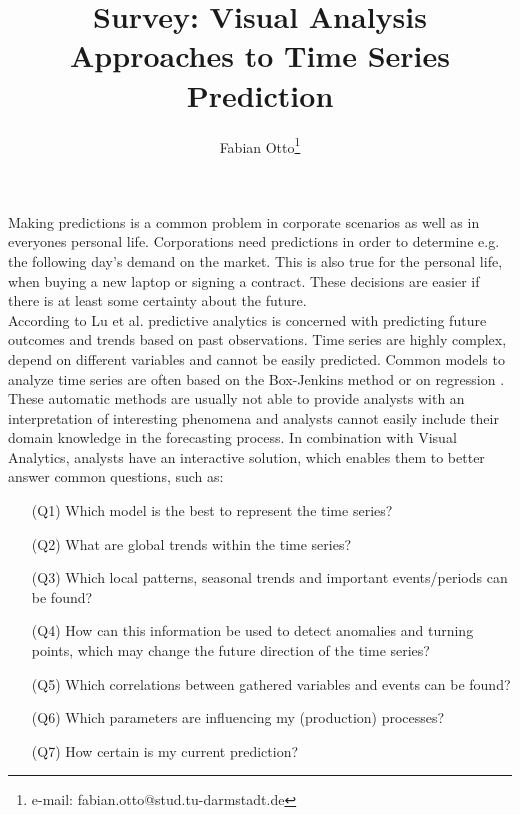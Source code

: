 \documentclass[electronic]{vgtc}             %
\title{Survey: Visual Analysis Approaches to Time Series Prediction}
\author{Fabian Otto\thanks{e-mail: fabian.otto@stud.tu-darmstadt.de}}
\affiliation{\scriptsize Technische Universit\"at Darmstadt}
\begin{document}

\maketitle

Making predictions is a common problem in corporate scenarios as well as in everyones personal life. 
Corporations need predictions in order to determine e.g. the following day's demand on the market.
This is also true for the personal life, when buying a new laptop or signing a contract.
These decisions are easier if there is at least some certainty about the future.\\
According to Lu et al. \cite{Lu:2017} predictive analytics is concerned with predicting future outcomes and trends based on past observations.
Time series are highly complex, depend on different variables and cannot be easily predicted. 
Common models to analyze time series are often based on the Box-Jenkins method \cite{box:2015} or on regression \cite{draper:2014}.
These automatic methods are usually not able to provide analysts with an interpretation of interesting phenomena and analysts cannot easily include their domain knowledge in the forecasting process.
In combination with Visual Analytics, analysts have an interactive solution, which enables them to better answer common questions, such as: 
\begin{enumerate}
	\itemsep0em 
	\item[(Q1)] Which model is the best to represent the time series?
	\item[(Q2)] What are global trends within the time series?
	\item[(Q3)] Which local patterns, seasonal trends and important events/periods can be found?
	\item[(Q4)] How can this information be used to detect anomalies and turning points, which may change the future direction of the time series?
	\item[(Q5)] Which correlations between gathered variables and events can be found?
	\item[(Q6)] Which parameters are influencing my (production) processes?
	\item[(Q7)] How certain is my current prediction? 
\end{enumerate}
\end{document}

